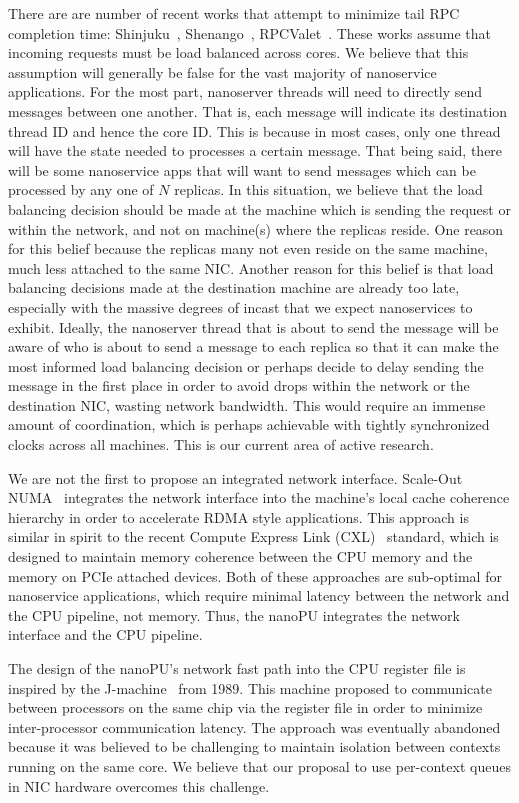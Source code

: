 There are are number of recent works that attempt to minimize tail RPC completion time: Shinjuku~\cite{shinjuku}, Shenango~\cite{shenango}, RPCValet~\cite{rpcvalet}.
These works assume that incoming requests must be load balanced across cores.
We believe that this assumption will generally be false for the vast majority of nanoservice applications.
For the most part, nanoserver threads will need to directly send messages between one another.
That is, each message will indicate its destination thread ID and hence the core ID.
This is because in most cases, only one thread will have the state needed to processes a certain message.
That being said, there will be some nanoservice apps that will want to send messages which can be processed by any one of $N$ replicas.
In this situation, we believe that the load balancing decision should be made at the machine which is sending the request or within the network, and not on machine(s) where the replicas reside.
One reason for this belief because the replicas many not even reside on the same machine, much less attached to the same NIC.
Another reason for this belief is that load balancing decisions made at the destination machine are already too late, especially with the massive degrees of incast that we expect nanoservices to exhibit.
Ideally, the nanoserver thread that is about to send the message will be aware of who is about to send a message to each replica so that it can make the most informed load balancing decision or perhaps decide to delay sending the message in the first place in order to avoid drops within the network or the destination NIC, wasting network bandwidth.
This would require an immense amount of coordination, which is perhaps achievable with tightly synchronized clocks across all machines.
This is our current area of active research.

We are not the first to propose an integrated network interface.
Scale-Out NUMA~\cite{scale-out-numa} integrates the network interface into the machine's local cache coherence hierarchy in order to accelerate RDMA style applications.
This approach is similar in spirit to the recent Compute Express Link (CXL)~\cite{cxl} standard, which is designed to maintain memory coherence between the CPU memory and the memory on PCIe attached devices.
Both of these approaches are sub-optimal for nanoservice applications, which require minimal latency between the network and the CPU pipeline, not memory.
Thus, the nanoPU integrates the network interface and the CPU pipeline.

The design of the nanoPU's network fast path into the CPU register file is inspired by the J-machine~\cite{jmachine} from 1989.
This machine proposed to communicate between processors on the same chip via the register file in order to minimize inter-processor communication latency.
The approach was eventually abandoned because it was believed to be challenging to maintain isolation between contexts running on the same core.
We believe that our proposal to use per-context queues in NIC hardware overcomes this challenge.

